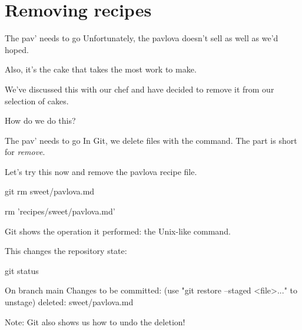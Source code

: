 \documentclass{git_course}
\begin{document}
\section{Removing recipes}

\begin{frame}[fragile]{The pav' needs to go}
    Unfortunately, the pavlova doesn't sell as well as we'd hoped.

    Also, it's the cake that takes the most work to make.

    We've discussed this with our chef and have decided to remove it from
    our selection of cakes.

    How do we do this?
\end{frame}

\begin{frame}[fragile]{The pav' needs to go}
    In Git, we delete files with the  command.  The 
    part is short for \emph{remove}.

    Let's try this now and remove the pavlova recipe file.
    \begin{shellcode}
        git rm sweet/pavlova.md
    \end{shellcode}
    \begin{outputcode}
        rm 'recipes/sweet/pavlova.md'
    \end{outputcode}

    Git shows the operation it performed: the Unix-like  command.

    This changes the repository state:
    \begin{shellcode}
        git status
    \end{shellcode}
    \begin{outputcode}
On branch main
Changes to be committed:
  (use "git restore --staged <file>..." to unstage)
        deleted:    sweet/pavlova.md
    \end{outputcode}
    Note: Git also shows us how to undo the deletion!
\end{frame}
\end{document}
